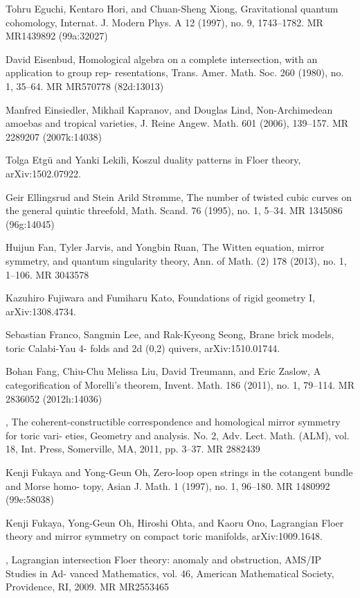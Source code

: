 {\begin{list}{}{%
  \setlength{\leftmargin}{3.4em}%
  \setlength{\itemindent}{-3.4em}%
  \setlength{\itemsep}{1.5pt}%
  \setlength{\parsep}{0pt}%
  \setlength{\listparindent}{0pt}%
}
\item[{[EHX97]}] Tohru Eguchi, Kentaro Hori, and Chuan-Sheng Xiong, Gravitational quantum cohomology, Internat. J. Modern Phys. A 12 (1997), no. 9, 1743--1782. MR MR1439892 (99a:32027)
\item[{[Eis80]}] David Eisenbud, Homological algebra on a complete intersection, with an application to group rep- resentations, Trans. Amer. Math. Soc. 260 (1980), no. 1, 35--64. MR MR570778 (82d:13013)
\item[{[EKL06]}] Manfred Einsiedler, Mikhail Kapranov, and Douglas Lind, Non-Archimedean amoebas and tropical varieties, J. Reine Angew. Math. 601 (2006), 139--157. MR 2289207 (2007k:14038)
\item[{[EL]}] Tolga Etgü and Yanki Lekili, Koszul duality patterns in Floer theory, arXiv:1502.07922.
\item[{[ES95]}] Geir Ellingsrud and Stein Arild Strømme, The number of twisted cubic curves on the general quintic threefold, Math. Scand. 76 (1995), no. 1, 5--34. MR 1345086 (96g:14045)
\item[{[FJR13]}] Huijun Fan, Tyler Jarvis, and Yongbin Ruan, The Witten equation, mirror symmetry, and quantum singularity theory, Ann. of Math. (2) 178 (2013), no. 1, 1--106. MR 3043578
\item[{[FK]}] Kazuhiro Fujiwara and Fumiharu Kato, Foundations of rigid geometry I, arXiv:1308.4734.
\item[{[FLS]}] Sebastian Franco, Sangmin Lee, and Rak-Kyeong Seong, Brane brick models, toric Calabi-Yau 4- folds and 2d (0,2) quivers, arXiv:1510.01744.
\item[{[FLTZ11a]}] Bohan Fang, Chiu-Chu Melissa Liu, David Treumann, and Eric Zaslow, A categorification of Morelli’s theorem, Invent. Math. 186 (2011), no. 1, 79--114. MR 2836052 (2012h:14036)
\item[{[FLTZ11b]}] , The coherent-constructible correspondence and homological mirror symmetry for toric vari- eties, Geometry and analysis. No. 2, Adv. Lect. Math. (ALM), vol. 18, Int. Press, Somerville, MA, 2011, pp. 3--37. MR 2882439
\item[{[FO97]}] Kenji Fukaya and Yong-Geun Oh, Zero-loop open strings in the cotangent bundle and Morse homo- topy, Asian J. Math. 1 (1997), no. 1, 96--180. MR 1480992 (99e:58038)
\item[{[FOOO]}] Kenji Fukaya, Yong-Geun Oh, Hiroshi Ohta, and Kaoru Ono, Lagrangian Floer theory and mirror symmetry on compact toric manifolds, arXiv:1009.1648.
\item[{[FOOO09]}] , Lagrangian intersection Floer theory: anomaly and obstruction, AMS/IP Studies in Ad- vanced Mathematics, vol. 46, American Mathematical Society, Providence, RI, 2009. MR MR2553465

\end{list}}
